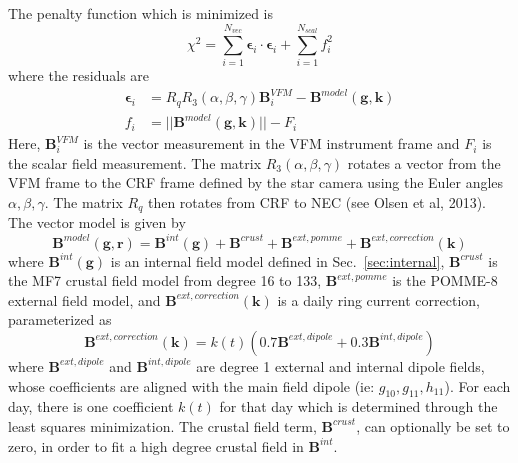 \documentclass{article}
\begin{document}
The penalty function which is minimized is
\begin{equation}
\chi^2 = \sum_{i=1}^{N_{vec}} \boldsymbol{\epsilon}_i \cdot \boldsymbol{\epsilon}_i + \sum_{i=1}^{N_{scal}} f_i^2
\end{equation}
where the residuals are
\begin{align}
\boldsymbol{\epsilon}_i & = R_q R_3(\alpha,\beta,\gamma) \mathbf{B}^{VFM}_i - \mathbf{B}^{model}(\mathbf{g},\mathbf{k}) \\
f_i & = || \mathbf{B}^{model}(\mathbf{g},\mathbf{k}) || - F_i
\end{align}
Here, $\mathbf{B}^{VFM}_i$ is the vector measurement in the VFM instrument frame and $F_i$ is the scalar field
measurement. The matrix $R_3(\alpha,\beta,\gamma)$ rotates a vector from the VFM frame to the CRF frame defined
by the star camera using the Euler angles $\alpha,\beta,\gamma$. The matrix $R_q$ then rotates from CRF to NEC
(see Olsen et al, 2013). The vector model is given by
\begin{equation}
\mathbf{B}^{model}(\mathbf{g},\mathbf{r}) = \mathbf{B}^{int}(\mathbf{g}) + \mathbf{B}^{crust} + \mathbf{B}^{ext,pomme} + \mathbf{B}^{ext,correction}(\mathbf{k})
\end{equation}
where $\mathbf{B}^{int}(\mathbf{g})$ is an internal field model defined in Sec.~\ref{sec:internal},
$\mathbf{B}^{crust}$ is the MF7 crustal field model from degree 16 to 133,
$\mathbf{B}^{ext,pomme}$ is the POMME-8 external field model, and $\mathbf{B}^{ext,correction}(\mathbf{k})$ is a daily
ring current correction, parameterized as
\begin{equation}
\mathbf{B}^{ext,correction}(\mathbf{k}) = k(t) \left( 0.7 \mathbf{B}^{ext,dipole} + 0.3 \mathbf{B}^{int,dipole} \right)
\end{equation}
where $\mathbf{B}^{ext,dipole}$ and $\mathbf{B}^{int,dipole}$ are degree 1 external and internal dipole fields,
whose coefficients are aligned with the main field dipole (ie: $g_{10},g_{11},h_{11}$). For each day, there is
one coefficient $k(t)$ for that day which is determined through the least
squares minimization. The crustal field term, $\mathbf{B}^{crust}$, can
optionally be set to zero, in order to fit a high degree crustal field
in $\mathbf{B}^{int}$.
\end{document}
